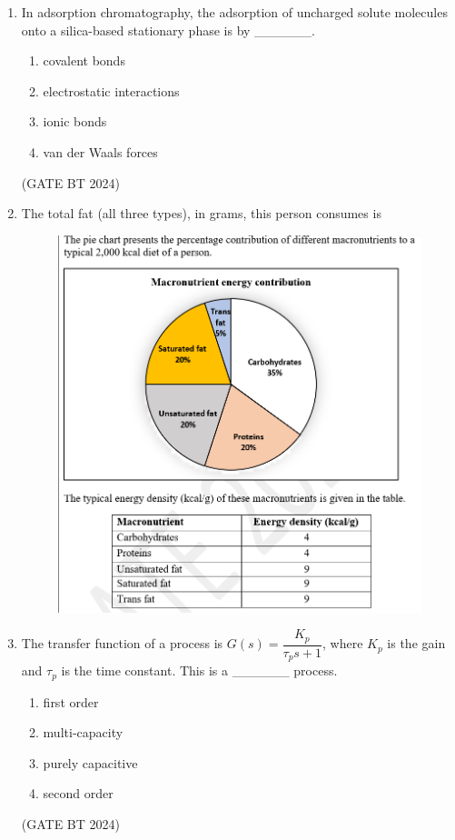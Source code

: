 \documentclass[journal,12pt,onecolumn]{IEEEtran}
\theoremstyle{remark}
\begin{document}
\begin{enumerate}
\item 
In adsorption chromatography, the adsorption of uncharged solute molecules onto a silica-based stationary phase is by \_\_\_\_\_\_.
\begin{multicols}{2}
\begin{enumerate}
    \item covalent bonds
    \item electrostatic interactions
    \item ionic bonds
    \item van der Waals forces
\end{enumerate}
\end{multicols}
\hfill(GATE BT 2024)

\item 
The total fat (all three types), in grams, this person consumes is
\begin{figure}
\includegraphics[width=\columnwidth]{figs/table.png}
    \label{fig:macronutrient_pie}
\end{figure}

\item 
The transfer function of a process is $G(s) = \dfrac{K_p}{\tau_p s + 1}$, where $K_p$ is the gain and $\tau_p$ is the time constant. This is a \_\_\_\_\_\_ process.
\begin{multicols}{2}
\begin{enumerate}
    \item first order
    \item multi-capacity
    \item purely capacitive
    \item second order
\end{enumerate}
\end{multicols}
\hfill(GATE BT 2024)


\end{enumerate}
\end{document}
